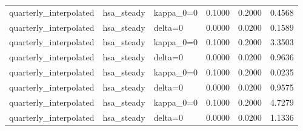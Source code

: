 \begin{tabular}{lllrrr}
quarterly\_interpolated & hsa\_steady & kappa\_0=0 & 0.1000 & 0.2000 & 0.4568 \\
quarterly\_interpolated & hsa\_steady & delta=0 & 0.0000 & 0.0200 & 0.1589 \\
quarterly\_interpolated & hsa\_steady & kappa\_0=0 & 0.1000 & 0.2000 & 3.3503 \\
quarterly\_interpolated & hsa\_steady & delta=0 & 0.0000 & 0.0200 & 0.9636 \\
quarterly\_interpolated & hsa\_steady & kappa\_0=0 & 0.1000 & 0.2000 & 0.0235 \\
quarterly\_interpolated & hsa\_steady & delta=0 & 0.0000 & 0.0200 & 0.9575 \\
quarterly\_interpolated & hsa\_steady & kappa\_0=0 & 0.1000 & 0.2000 & 4.7279 \\
quarterly\_interpolated & hsa\_steady & delta=0 & 0.0000 & 0.0200 & 1.1336 \\
\bottomrule
\end{tabular}
